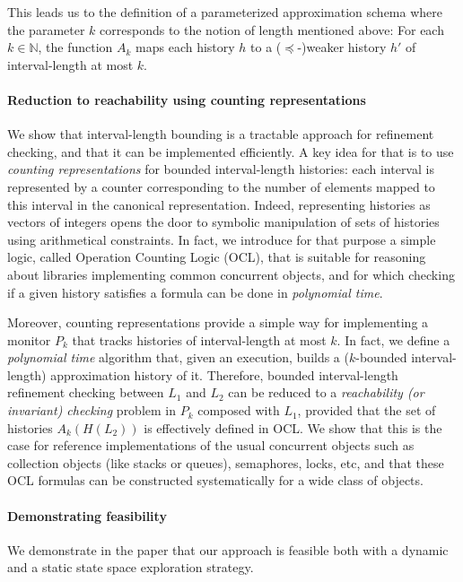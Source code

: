 This leads us to the definition of a parameterized approximation schema where
the parameter $k$ corresponds to the notion of length mentioned above: For each
$k \in \mathbb{N}$, the function $A_k$ maps each history $h$ to a
($\preceq$-)weaker history $h'$ of interval-length at most $k$.

\paragraph{Reduction to reachability using counting representations}

We show that interval-length bounding is a tractable approach for refinement
checking, and that it can be implemented efficiently. A key idea for that is to
use \emph{counting representations} for bounded interval-length histories: each
interval is represented by a counter corresponding to the number of elements
mapped to this interval in the canonical representation. Indeed, representing
histories as vectors of integers opens the door to symbolic manipulation of
sets of histories using arithmetical constraints. In fact, we introduce for
that purpose a simple logic, called Operation Counting Logic (OCL), that is
suitable for reasoning about libraries implementing common concurrent objects,
and for which checking if a given history satisfies a formula can be done in
\emph{polynomial time}.

Moreover, counting representations provide a simple way for implementing a
monitor $P_k$ that tracks histories of interval-length at most $k$. In fact, we
define a \emph{polynomial time} algorithm that, given an execution, builds a
($k$-bounded interval-length) approximation history of it. Therefore, bounded
interval-length refinement checking between $L_1$ and $L_2$ can be reduced to a
\emph{reachability (or invariant) checking} problem in $P_k$ composed with
$L_1$, provided that the set of histories $A_k(H(L_2))$ is effectively defined
in OCL. We show that this is the case for reference implementations of the
usual concurrent objects such as collection objects (like stacks or queues),
semaphores, locks, etc, and that these OCL formulas can be constructed
systematically for a wide class of objects.

\paragraph{Demonstrating feasibility}

We demonstrate in the paper that our approach is feasible both with a dynamic
and a static state space exploration strategy.

